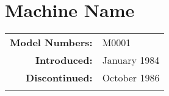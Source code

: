 


\section{Machine Name}
\sectionrule

\begin{tabular}{ r{1.7in} p{6in} }
\textbf{Model Numbers:} & M0001 \\
\textbf{Introduced:} & January 1984 \\
\textbf{Discontinued:} & October 1986 \\
\\


\end{tabular}